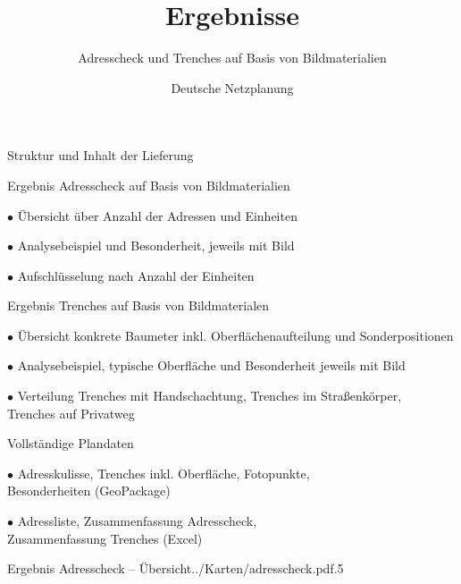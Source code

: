 \documentclass[11pt, dvipsnames,aspectratio=169]{beamer}
\author[DNP]{Deutsche Netzplanung}
\title[Ergebnisse \Ort{} (\Kreis, \Land)]{\textbf{Ergebnisse} \\ \Ort}
\date{\Abgabedatum}
\subtitle{Adresscheck und Trenches auf Basis von Bildmaterialien}
\begin{document}
	
{
\maketitle
}

\begin{frame}{Struktur und Inhalt der Lieferung \Ort}
	\begin{bulletlist}{5pt}
		\item Ergebnis Adresscheck auf Basis von Bildmaterialien
			\begin{bulletlist}{3pt}
				\item[$\bullet$] Übersicht über Anzahl der Adressen und Einheiten
				\item[$\bullet$] Analysebeispiel und Besonderheit, jeweils mit Bild
				\item[$\bullet$] Aufschlüsselung nach Anzahl der Einheiten
			\end{bulletlist}
		\item Ergebnis Trenches auf Basis von Bildmaterialen
		\begin{bulletlist}{3pt}
			\item[$\bullet$] Übersicht konkrete Baumeter inkl. Oberflächenaufteilung und Sonderpositionen
			\item[$\bullet$] Analysebeispiel, typische Oberfläche und Besonderheit jeweils mit Bild
			\item[$\bullet$] Verteilung Trenches mit Handschachtung, Trenches im Straßenkörper, \\ Trenches auf Privatweg
		\end{bulletlist}
		\item Vollständige Plandaten
		\begin{bulletlist}{3pt}
			\item[$\bullet$] Adresskulisse, Trenches inkl. Oberfläche, Fotopunkte, \\ Besonderheiten (GeoPackage)
			\item[$\bullet$] Adressliste, Zusammenfassung Adresscheck, \\ Zusammenfassung Trenches (Excel)
		\end{bulletlist}
	\end{bulletlist}
\end{frame}

\begin{mapframe}{Ergebnis Adresscheck -- Übersicht}{../Karten/adresscheck.pdf}{.5\linewidth}
	\centering
	\resizebox{\textwidth}{!}{\adressStatistik}
\end{mapframe}
\end{document}
